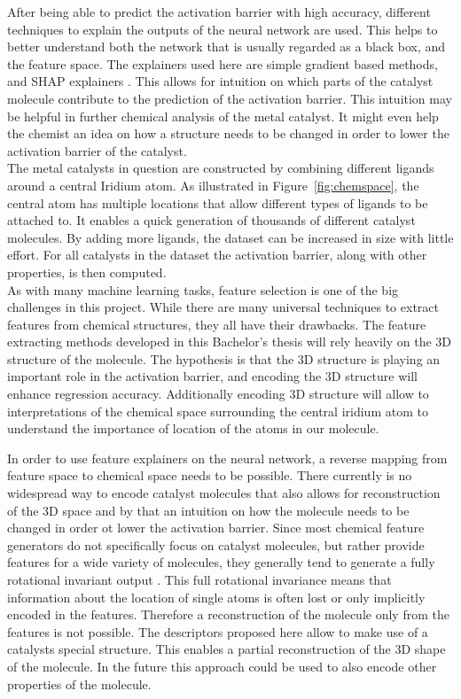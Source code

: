 After being able to predict the activation barrier with high accuracy, different techniques to explain the 
outputs of the neural network are used.
This helps to better understand both the network that is usually regarded as a black box, and the feature space.
The explainers used here are simple gradient based methods, and SHAP explainers \cite{NIPS2017_7062}.
This allows for intuition on which parts of the catalyst molecule contribute to the prediction of the activation barrier.
This intuition may be helpful in further chemical analysis of the metal catalyst.
It might even help the chemist an idea on how a structure needs to be changed in order to lower the activation barrier of the catalyst.
\\

The metal catalysts in question are constructed by combining different ligands around a central Iridium atom.
As illustrated in Figure~\ref{fig:chemspace}, the central atom has multiple locations that allow different types of ligands to be attached to.  
It enables a quick generation of thousands of different catalyst molecules.
By adding more ligands, the dataset can be increased in size with little effort.
For all catalysts in the dataset the activation barrier, along with other properties, is then computed.
\\
As with many machine learning tasks, feature selection is one of the big challenges in this project.
While there are many universal techniques to extract features from chemical structures, they all have their drawbacks.
The feature extracting methods developed in this Bachelor's thesis will rely heavily on the 3D structure of the molecule.
The hypothesis is that the 3D structure is playing an important role in the activation barrier, and encoding the 3D structure will enhance regression accuracy.
Additionally encoding 3D structure will allow to interpretations of the chemical space surrounding the central 
iridium atom to understand the importance of location of the atoms in our molecule.

In order to use feature explainers on the neural network, a reverse mapping from feature space to chemical space needs to be possible.
There currently is no widespread way to encode catalyst molecules that also allows for 
reconstruction of the 3D space and by that an intuition on how the molecule needs to be changed in order ot lower the activation barrier.
Since most chemical feature generators do not specifically focus on catalyst molecules,
but rather provide features for a wide variety of molecules, they generally tend to generate a fully rotational invariant output \cite{Bart_k_2013}.
This full rotational invariance means that information about the location of single atoms is often lost or only implicitly encoded in the features.
Therefore a reconstruction of the molecule only from the features is not possible.
The descriptors proposed here allow to make use of a catalysts special structure.
This enables a partial reconstruction of the 3D shape of the molecule.
In the future this approach could be used to also encode other properties of the molecule.
\\

